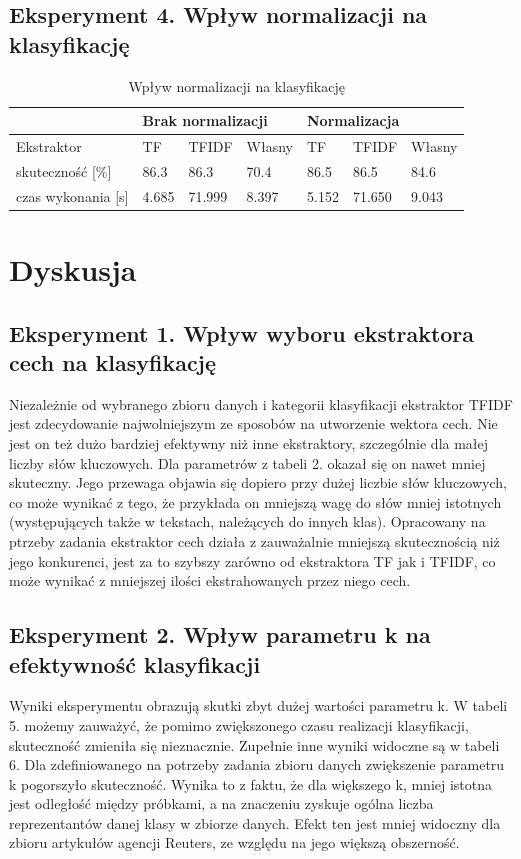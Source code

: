 \documentclass{classrep}
\begin{document}
\subsection{Eksperyment 4. Wpływ normalizacji na klasyfikację}

\begin{table}[h]
	\caption{Wpływ normalizacji na klasyfikację}
	\begin{tabular}{l|l|l|l|l|l|l}
		& \multicolumn{3}{|l}{ Brak normalizacji}	& \multicolumn{3}{|l}{ Normalizacja}\\
		\hline
		Ekstraktor& TF & TFIDF & Własny & TF & TFIDF & Własny\\
		\hline
		skuteczność [\%]   &86.3&86.3&70.4&86.5&86.5&84.6\\
		czas wykonania [s] &4.685&71.999&8.397&5.152&71.650&9.043\\
	\end{tabular}
\end{table}
\newpage

\section{Dyskusja}
\subsection{Eksperyment 1. Wpływ wyboru ekstraktora cech na klasyfikację}
Niezależnie od wybranego zbioru danych i kategorii klasyfikacji ekstraktor TFIDF jest zdecydowanie najwolniejszym ze sposobów na utworzenie wektora cech. Nie jest on też dużo bardziej efektywny niż inne ekstraktory, szczególnie dla małej liczby słów kluczowych. Dla parametrów z tabeli 2. okazał się on nawet mniej skuteczny. Jego przewaga objawia się dopiero przy dużej liczbie słów kluczowych, co może wynikać z tego, że przykłada on mniejszą wagę do słów mniej istotnych (występujących także w tekstach, należących do innych klas). Opracowany na ptrzeby zadania ekstraktor cech działa z zauważalnie mniejszą skutecznością niż jego konkurenci, jest za to szybszy zarówno od ekstraktora TF jak i TFIDF, co może wynikać z mniejszej ilości ekstrahowanych przez niego cech.
\subsection{Eksperyment 2. Wpływ parametru k na efektywność klasyfikacji}
 Wyniki eksperymentu obrazują skutki zbyt dużej wartości parametru k. W tabeli 5. możemy zauważyć, że pomimo zwiększonego czasu realizacji klasyfikacji, skuteczność zmieniła się nieznacznie. Zupełnie inne wyniki widoczne są w tabeli 6. Dla zdefiniowanego na potrzeby zadania zbioru danych zwiększenie parametru k pogorszyło skuteczność. Wynika to z faktu, że dla większego k, mniej istotna jest odległość między próbkami, a na znaczeniu zyskuje ogólna liczba reprezentantów danej klasy w zbiorze danych. Efekt ten jest mniej widoczny dla zbioru artykułów agencji Reuters, ze względu na jego większą obszerność.
\end{document}
